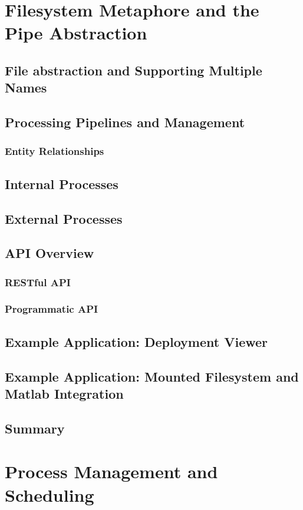 \chapter{Filesystem Metaphore and the Pipe Abstraction}
\section{File abstraction and Supporting Multiple Names}
\section{Processing Pipelines and Management}
	\subsection{Entity Relationships}
\section{Internal Processes}
\section{External Processes}
\section{API Overview}
	\subsection{RESTful API}
	\subsection{Programmatic API}
\section{Example Application: Deployment Viewer}
\section{Example Application: Mounted Filesystem and Matlab Integration}
\section{Summary}


\chapter{Process Management and Scheduling}
